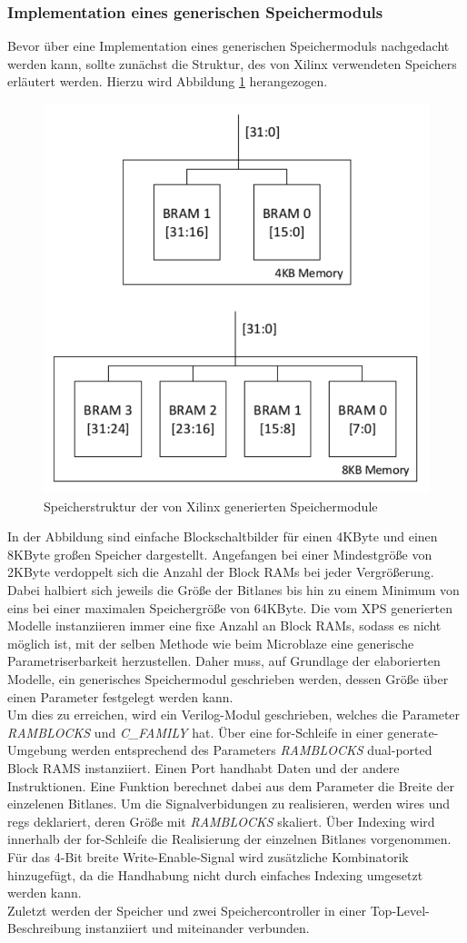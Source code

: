 \subsubsection{Implementation eines generischen Speichermoduls} \label{subsubsec:genMem}
Bevor über eine Implementation eines generischen Speichermoduls nachgedacht werden kann, sollte zunächst die Struktur, des von Xilinx verwendeten Speichers erläutert werden. Hierzu wird Abbildung \ref{fig:XilinxMEM} herangezogen.
\begin{figure}[ht!]
\centering
\includegraphics[width=0.7\linewidth]{./bilder/XilinxMEM}
\caption{Speicherstruktur der von Xilinx generierten Speichermodule}
\label{fig:XilinxMEM}
\end{figure}
In der Abbildung sind einfache Blockschaltbilder für einen 4KByte und einen 8KByte großen Speicher dargestellt. Angefangen bei einer Mindestgröße von 2KByte verdoppelt sich die Anzahl der Block RAMs bei jeder Vergrößerung. Dabei halbiert sich jeweils die Größe der Bitlanes bis hin zu einem Minimum von eins bei einer maximalen Speichergröße von 64KByte. Die vom XPS generierten Modelle instanziieren immer eine fixe Anzahl an Block RAMs, sodass es nicht möglich ist, mit der selben Methode wie beim Microblaze eine generische Parametriserbarkeit herzustellen. Daher muss, auf Grundlage der elaborierten Modelle, ein generisches Speichermodul geschrieben werden, dessen Größe über einen Parameter festgelegt werden kann.\\
Um dies zu erreichen, wird ein Verilog-Modul geschrieben, welches die Parameter \textit{RAMBLOCKS} und \textit{C\_FAMILY} hat. Über eine for-Schleife in einer generate-Umgebung werden entsprechend des Parameters \textit{RAMBLOCKS} dual-ported Block RAMS instanziiert. Einen Port handhabt Daten und der andere Instruktionen. Eine Funktion berechnet dabei aus dem Parameter die Breite der einzelenen Bitlanes. Um die Signalverbidungen zu realisieren, werden wires und regs deklariert, deren Größe mit \textit{RAMBLOCKS} skaliert. Über Indexing wird innerhalb der for-Schleife die Realisierung der einzelnen Bitlanes vorgenommen. Für das 4-Bit breite Write-Enable-Signal wird zusätzliche Kombinatorik hinzugefügt, da die Handhabung nicht durch einfaches Indexing umgesetzt werden kann.\\
Zuletzt werden der Speicher und zwei Speichercontroller in einer Top-Level-Beschreibung instanziiert und miteinander verbunden.

